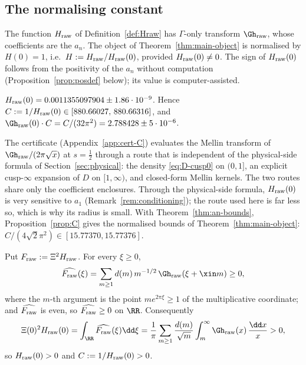 \subsection{The normalising constant}\label{ssec:C}

The function $H_{\rm raw}$ of Definition~\ref{def:Hraw} has $\Gamma$-only transform $\Gh_{\rm raw}$, whose coefficients are the $a_n$. The object of
Theorem~\ref{thm:main-object} is normalised by $H(0)=1$, i.e.\ $H:=H_{\rm raw}/H_{\rm raw}(0)$, provided $H_{\rm raw}(0)\neq0$. The sign of
$H_{\rm raw}(0)$ follows from the positivity of the $a_n$ without computation (Proposition~\ref{prop:posdef} below); its value is
computer-assisted.

\begin{proposition}\label{prop:C}
$H_{\rm raw}(0)=0.0011355097904\pm1.86\cdot10^{-9}$. Hence $C:=1/H_{\rm raw}(0)\in[880.66027,\,880.66316]$, and
$\Gh_{\rm raw}(0)\cdot C=C/(32\pi^2)=2.788428\pm5\cdot10^{-6}$.
\end{proposition}

The certificate (Appendix~\ref{app:cert-C}) evaluates the Mellin transform of $\Gh_{\rm raw}/(2\pi\sqrt x)$ at $s=\frac12$ through a route that is
independent of the physical-side formula of Section~\ref{sec:physical}: the density \eqref{eq:D-cusp0} on $(0,1]$, an explicit cusp-$\infty$
expansion of $D$ on $[1,\infty)$, and closed-form Mellin kernels. The two routes share only the coefficient enclosures. Through the
physical-side formula, $H_{\rm raw}(0)$ is very sensitive to $a_1$ (Remark~\ref{rem:conditioning}); the route used here is far less so, which
is why its radius is small. With
Theorem~\ref{thm:an-bounds}, Proposition~\ref{prop:C} gives the normalised bounds of Theorem~\ref{thm:main-object}:
$C/(4\sqrt2\pi^2)\in[15.77370,15.77376]$.

\begin{proposition}\label{prop:posdef}
Put $F_{\rm raw}:=\Xi^2H_{\rm raw}$. For every $\xi\ge0$,
\[
\widehat{F_{\rm raw}}(\xi)=\sum_{m\ge1}d(m)\,m^{-1/2}\,\Gh_{\rm raw}(\xi+\xin m)\ge0,
\]
where the $m$-th argument is the point $me^{2\pi\xi}\ge1$ of the multiplicative coordinate; and $\widehat{F_{\rm raw}}$ is even, so
$\widehat{F_{\rm raw}}\ge0$ on $\RR$. Consequently
\[
\Xi(0)^2H_{\rm raw}(0)=\int_\RR\widehat{F_{\rm raw}}(\xi)\dd\xi=\frac1\pi\sum_{m\ge1}\frac{d(m)}{\sqrt m}\int_m^\infty\Gh_{\rm raw}(x)\,\frac{\dd x}x>0,
\]
so $H_{\rm raw}(0)>0$ and $C:=1/H_{\rm raw}(0)>0$.
\end{proposition}

